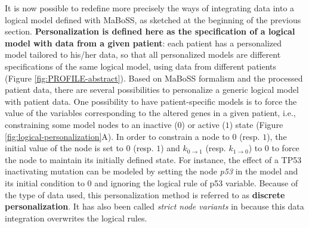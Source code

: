 \documentclass[a4paper,12pt,twoside,onecolumn,openright,final,oldfontcommands]{memoir}
\begin{document}
It is now possible to redefine more precisely the ways of integrating
data into a logical model defined with MaBoSS, as sketched at the
beginning of the previous section. \textbf{Personalization is defined
here as the specification of a logical model with data from a given
patient}: each patient has a personalized model tailored to his/her
data, so that all personalized models are different specifications of
the same logical model, using data from different patients (Figure
\ref{fig:PROFILE-abstract}). Based on MaBoSS formalism and the processed
patient data, there are several possibilities to personalize a generic
logical model with patient data. One possibility to have
patient-specific models is to force the value of the variables
corresponding to the altered genes in a given patient, i.e.,
constraining some model nodes to an inactive (\(0\)) or active (\(1\))
state (Figure \ref{fig:logical-personalization}A). In order to constrain
a node to \(0\) (resp. \(1\)), the initial value of the node is set to
\(0\) (resp. \(1\)) and \(k_{0\rightarrow 1}\) (resp.
\(k_{1\rightarrow 0}\)) to \(0\) to force the node to maintain its
initially defined state. For instance, the effect of a TP53 inactivating
mutation can be modeled by setting the node \emph{p53} in the model and
its initial condition to \(0\) and ignoring the logical rule of p53
variable. Because of the type of data used, this personalization method
is referred to as \textbf{discrete personalization}. It has also been
called \emph{strict node variants} in \citet{beal2019personalization}
because this data integration overwrites the logical rules.
\end{document}
